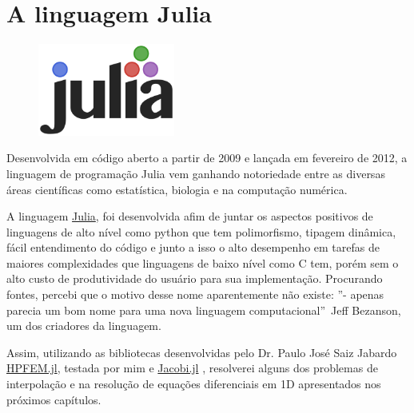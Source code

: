  
\section{A linguagem Julia}
\begin{figure}[H]
\centering
\includegraphics[width=0.4\textwidth,left]{figuras/julia.png}
\end{figure}
Desenvolvida em código aberto a partir de 2009 e lançada em fevereiro de 2012, a linguagem de programação Julia vem ganhando notoriedade entre as diversas áreas científicas como estatística, biologia e na computação numérica.

A linguagem \href{http://julialang.org/}{Julia}, foi desenvolvida afim de juntar os aspectos positivos de linguagens de alto nível como python que tem polimorfismo, tipagem dinâmica, fácil entendimento do código e junto a isso o alto desempenho em tarefas de maiores complexidades que linguagens de baixo nível como C tem, porém sem o  alto custo de produtividade do usuário para sua implementação. Procurando fontes, percebi que o motivo desse nome aparentemente não existe: ''- apenas parecia um bom nome para uma nova linguagem computacional''\  Jeff Bezanson, um dos criadores da linguagem.

Assim, utilizando as bibliotecas desenvolvidas pelo  Dr. Paulo José Saiz Jabardo \href{www.github.com/pjabardo/HPFEM.jl}{HPFEM.jl}, testada por mim e \href{www.github.com/pjabardo/Jacobi.jl}{Jacobi.jl} , resolverei alguns dos problemas de interpolação e na resolução de equações diferenciais em 1D apresentados nos próximos capítulos.
 
\pagebreak

%
%
%




